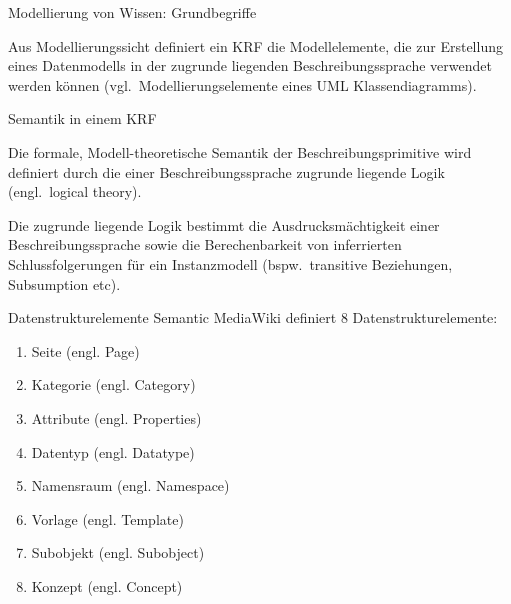 \documentclass[aspectratio=1610,onlymath]{beamer}
\begin{document}
\begin{frame}{Modellierung von Wissen: Grundbegriffe}

\footnotesize
{}	

\bigskip
Aus Modellierungssicht definiert ein KRF die Modellelemente, die zur Erstellung eines Datenmodells in der zugrunde liegenden Beschreibungssprache verwendet werden können (vgl.\ Modellierungselemente eines UML Klassendiagramms).

\bigskip
\alert{Semantik in einem KRF}

Die formale, Modell-theoretische Semantik der Beschreibungsprimitive wird definiert durch die einer Beschreibungssprache zugrunde liegende Logik (engl.\ logical theory).


Die zugrunde liegende Logik bestimmt die Ausdrucksmächtigkeit einer Beschreibungssprache sowie die Berechenbarkeit von inferrierten Schlussfolgerungen für ein Instanzmodell (bspw.\ transitive Beziehungen, Subsumption etc).

\end{frame}


\begin{frame}{Datenstrukturelemente}
	Semantic MediaWiki definiert \alert{8 Datenstrukturelemente}:
	\begin{enumerate}%
		\item \alert{Seite} (engl. Page)
		\item \alert{Kategorie} (engl. Category)
		\item \alert{Attribute} (engl. Properties)
		\item \alert{Datentyp} (engl. Datatype)
		\item \alert{Namensraum} (engl. Namespace)
		\item \alert{Vorlage} (engl. Template)
		\item \alert{Subobjekt} (engl. Subobject)
		\item \alert{Konzept} (engl. Concept)
	\end{enumerate}
	
\end{frame}
\end{document}

